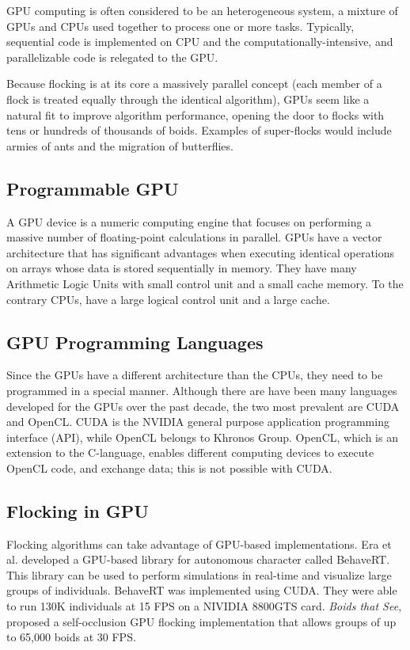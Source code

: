 GPU computing is often considered to be an heterogeneous system, a mixture of GPUs and CPUs used together to process one or more tasks. Typically, sequential code is implemented on CPU and the computationally-intensive, and parallelizable code is relegated to the GPU.

Because flocking is at its core a massively parallel concept (each member of a flock is treated equally through the identical algorithm), GPUs seem like a natural fit to improve algorithm performance, opening the door to flocks with tens or hundreds of thousands of boids. Examples of super-flocks would include armies of ants and the migration of butterflies. 


\subsection{Programmable GPU}
A GPU device is a numeric computing engine\cite{GPUbook} that focuses on performing a massive number of floating-point calculations in parallel. GPUs have a vector architecture that has significant advantages when executing identical operations on arrays whose data is stored sequentially in memory. They have many Arithmetic Logic Units with small control unit and a small cache memory. To the contrary CPUs, have a large logical control unit and a large cache. 

\subsection{GPU Programming Languages}
Since the GPUs have a different architecture than the CPUs, they need to be programmed in a special manner. Although there are have been many languages developed for the GPUs over the past decade, the two most prevalent are CUDA and OpenCL. CUDA is the NVIDIA  general purpose application programming interface (API)\cite{CUDAandOpenCL}, while OpenCL belongs to Khronos Group\cite{opencl}. OpenCL, which is an extension to the C-language,  enables different computing devices to execute OpenCL code, and exchange data; this is not 
possible with CUDA.
 
\subsection{Flocking in GPU}\label{flockingGPU}
Flocking algorithms can take advantage of GPU-based implementations. Era et al. developed a GPU-based library for autonomous character called BehaveRT\cite{BehaveRT}. This library can be used to perform simulations in real-time and visualize large groups of individuals. BehaveRT was implemented using CUDA. They were able to run 130K individuals at 15 FPS on a NIVIDIA 8800GTS card. \textit{Boids that See}, proposed a self-occlusion GPU flocking implementation that allows groups of up to 65,000 boids at 30 FPS\cite{boidsThatSee}. 

